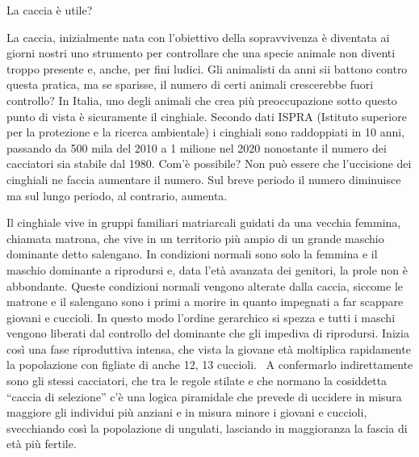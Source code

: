 \documentclass[12pt]{book} %
\begin{document}
\bigskip
\begin{mdframed}[linewidth=1pt]
La caccia è utile?

La caccia, inizialmente nata con l'obiettivo della sopravvivenza è diventata ai giorni nostri uno
strumento per controllare che una specie animale non diventi troppo presente e, anche, per fini ludici. Gli animalisti
da anni sii battono contro questa pratica, ma se sparisse, il numero di certi animali crescerebbe fuori controllo? In
Italia, uno degli animali che crea più preoccupazione sotto questo punto di vista è sicuramente il cinghiale. Secondo
dati ISPRA (Istituto superiore per la protezione e la ricerca ambientale) i cinghiali sono raddoppiati in 10 anni,
passando da 500 mila del 2010 a 1 milione nel 2020 nonostante il numero dei cacciatori sia stabile dal
1980. Com'è possibile? Non può essere che l'uccisione dei cinghiali ne faccia
aumentare il numero. Sul breve periodo il numero diminuisce ma sul lungo periodo, al contrario, aumenta.

Il cinghiale vive in gruppi familiari matriarcali guidati da una vecchia femmina, chiamata matrona, che vive in un
territorio più ampio di un grande maschio dominante detto salengano. In condizioni normali sono solo la femmina e il
maschio dominante a riprodursi e, data l'età avanzata dei genitori, la prole non è abbondante.
Queste condizioni normali vengono alterate dalla caccia, siccome le matrone e il salengano sono i primi a morire in
quanto impegnati a far scappare giovani e cuccioli. In questo modo l'ordine gerarchico si spezza e
tutti i maschi vengono liberati dal controllo del dominante che gli impediva di riprodursi. Inizia così una fase
riproduttiva intensa, che vista la giovane età moltiplica rapidamente la popolazione con figliate di anche 12, 13
cuccioli. \ A confermarlo indirettamente sono gli stessi cacciatori, che tra le regole stilate e che normano la
cosiddetta “caccia di selezione” c'è una logica piramidale che prevede di uccidere in misura maggiore gli individui più
anziani e in misura minore i giovani e cuccioli, svecchiando così la popolazione di ungulati, lasciando in maggioranza
la fascia di età più fertile.


\end{mdframed}
\end{document}
